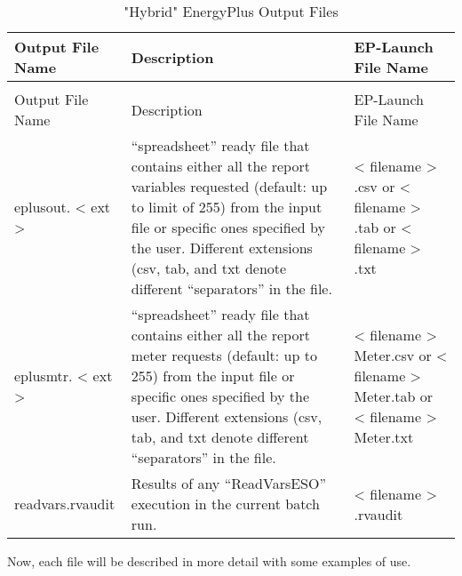 \begin{longtable}[c]{p{1.5in}p{3.0in}p{1.5in}}
\caption{"Hybrid" EnergyPlus Output Files \label{table:hybrid-energyplus-output-files}} \tabularnewline
\toprule 
Output File Name & Description & EP-Launch File Name \tabularnewline
\midrule
\endfirsthead

\caption[]{"Hybrid" EnergyPlus Output Files} \tabularnewline
\toprule 
Output File Name & Description & EP-Launch File Name \tabularnewline
\midrule
\endhead

eplusout. < ext >  ~ & “spreadsheet” ready file that contains either all the report variables requested (default: up to limit of 255) from the input file or specific ones specified by the user. Different extensions (csv, tab, and txt denote different “separators” in the file. & < filename > .csv or  < filename > .tab or  < filename > .txt \tabularnewline
eplusmtr. < ext >  ~ & “spreadsheet” ready file that contains either all the report meter requests (default: up to 255) from the input file or specific ones specified by the user. Different extensions (csv, tab, and txt denote different “separators” in the file. & < filename > Meter.csv or  < filename > Meter.tab or  < filename > Meter.txt \tabularnewline
readvars.rvaudit & Results of any “ReadVarsESO” execution in the current batch run. & < filename > .rvaudit \tabularnewline
\bottomrule
\end{longtable}

Now, each file will be described in more detail with some examples of use.
